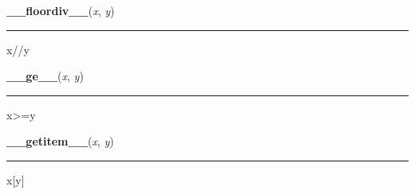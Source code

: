     \label{pygame:Color:__floordiv__}

    \vspace{0.5ex}

\hspace{.8\funcindent}\begin{boxedminipage}{\funcwidth}

    \raggedright \textbf{\_\_floordiv\_\_}(\textit{x}, \textit{y})

    \vspace{-1.5ex}

    \rule{\textwidth}{0.5\fboxrule}
\setlength{\parskip}{2ex}
    x//y

\setlength{\parskip}{1ex}
    \end{boxedminipage}

    \label{pygame:Color:__ge__}

    \vspace{0.5ex}

\hspace{.8\funcindent}\begin{boxedminipage}{\funcwidth}

    \raggedright \textbf{\_\_ge\_\_}(\textit{x}, \textit{y})

    \vspace{-1.5ex}

    \rule{\textwidth}{0.5\fboxrule}
\setlength{\parskip}{2ex}
    x{\textgreater}=y

\setlength{\parskip}{1ex}
    \end{boxedminipage}

    \label{pygame:Color:__getitem__}

    \vspace{0.5ex}

\hspace{.8\funcindent}\begin{boxedminipage}{\funcwidth}

    \raggedright \textbf{\_\_getitem\_\_}(\textit{x}, \textit{y})

    \vspace{-1.5ex}

    \rule{\textwidth}{0.5\fboxrule}
\setlength{\parskip}{2ex}
    x[y]

\setlength{\parskip}{1ex}
    \end{boxedminipage}

